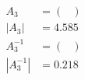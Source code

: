 
\begin{align}
A_3 & = 
\begin{pmatrix}

\end{pmatrix} \\
|A_3| & = 4.585 \\
A_3^{-1} & = 
\begin{pmatrix}

\end{pmatrix} \\
|A_3^{-1}| & = 0.218
\end{align}

